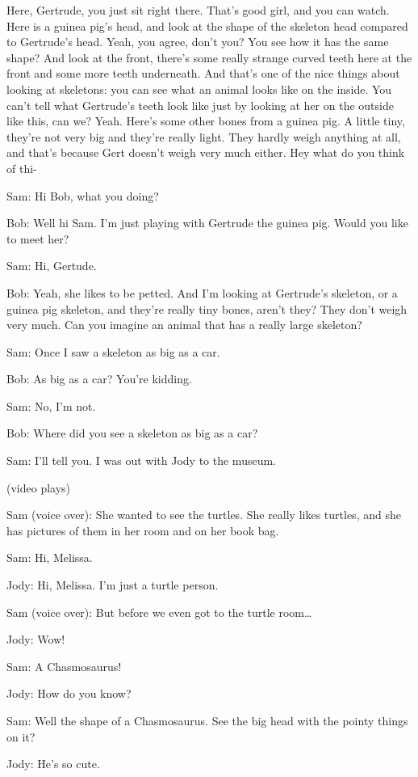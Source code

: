 Here, Gertrude, you just sit right there. That's good girl, and you can watch. Here is a guinea pig's head, and look at the shape of the skeleton head compared to Gertrude's head. Yeah, you agree, don't you? You see how it has the same shape? And look at the front, there's some really strange curved teeth here at the front and some more teeth underneath. And that's one of the nice things about looking at skeletons: you can see what an animal looks like on the inside. You can't tell what Gertrude's teeth look like just by looking at her on the outside like this, can we? Yeah. Here's some other bones from a guinea pig. A little tiny, they're not very big and they're really light. They hardly weigh anything at all, and that's because Gert doesn't weigh very much either. Hey what do you think of thi-

Sam: Hi Bob, what you doing?

Bob: Well hi Sam. I'm just playing with Gertrude the guinea pig. Would you like to meet her?

Sam: Hi, Gertude.

Bob: Yeah, she likes to be petted. And I'm looking at Gertrude's skeleton, or a guinea pig skeleton, and they're really tiny bones, aren't they? They don't weigh very much. Can you imagine an animal that has a really large skeleton?

Sam: Once I saw a skeleton as big as a car.

Bob: As big as a car? You're kidding.

Sam: No, I'm not.

Bob: Where did you see a skeleton as big as a car?

Sam: I'll tell you. I was out with Jody to the museum.

(video plays)

Sam (voice over): She wanted to see the turtles. She really likes turtles, and she has pictures of them in her room and on her book bag.

Sam: Hi, Melissa.

Jody: Hi, Melissa. I'm just a turtle person.

Sam (voice over): But before we even got to the turtle room\dots

Jody: Wow!

Sam: A Chasmosaurus!

Jody: How do you know?

Sam: Well the shape of a Chasmosaurus. See the big head with the pointy things on it?

Jody: He's so cute.

